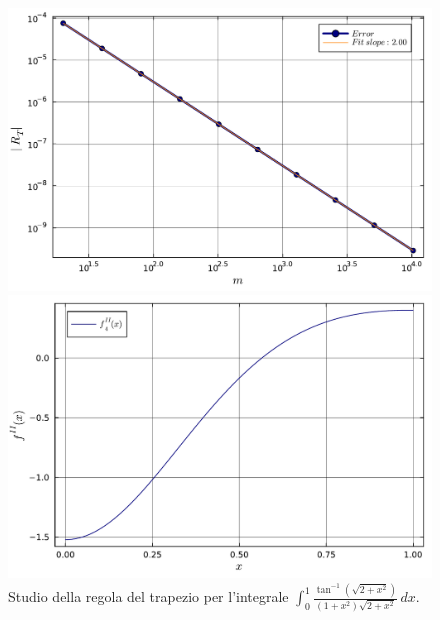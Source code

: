 \documentclass[letterpaper, 12pt]{article}
\numberwithin{equation}{section}    %
\begin{document}
\begin{figure}[!ht]
    \centering
    \begin{minipage}[b]{0.47\textwidth}
        \includegraphics[width=\textwidth]{5124.pdf}
    \end{minipage}
    \hspace{0.5cm}
    \begin{minipage}[b]{0.47\textwidth}
        \includegraphics[width=\textwidth]{5124_2.pdf}
    \end{minipage}
    \caption{Studio della regola del trapezio per l'integrale $\int_0^1 \frac{\tan^{-1}(\sqrt{2+x^2})}{(1+x^2)\sqrt{2+x^2}}\,dx$.}
    \label{fig:es5_1_2_4}
\end{figure}
\end{document}

